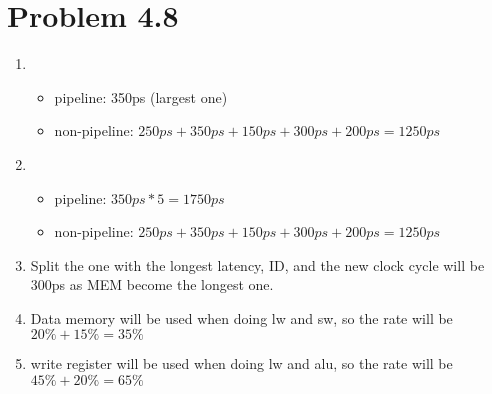 \documentclass{article}
\def\math#1{$#1$}
\begin{document}
\section{Problem 4.8}
\begin{enumerate}[1)]
    \item 
        \begin{itemize}
            \item pipeline: 350ps (largest one)
            \item non-pipeline: \math{250ps + 350ps + 150ps + 300ps + 200ps = 1250ps}
        \end{itemize}
    \item
        \begin{itemize}
            \item pipeline: \math{350ps * 5 = 1750ps}
            \item non-pipeline: \math{250ps + 350ps + 150ps + 300ps + 200ps = 1250ps}
        \end{itemize}
    \item Split the one with the longest latency, ID, and the new clock cycle will be 300ps as MEM become the longest one.
    \item Data memory will be used when doing lw and sw, so the rate will be \math{20\% + 15\% = 35\%}
    \item write register will be used when doing lw and alu, so the rate will be \math{45\% + 20\% = 65\%}
\end{enumerate}
\end{document}
